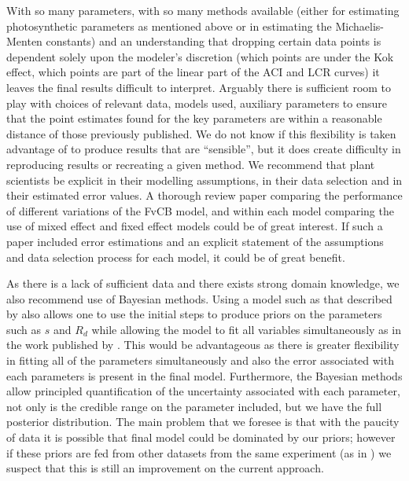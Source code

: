 \documentclass[11pt]{article} %
\begin{document}
With so many parameters, with so many methods available (either for estimating photosynthetic parameters as mentioned above or in estimating the Michaelis-Menten constants) and an understanding that dropping certain data points is dependent solely upon the modeler's discretion (which points are under the Kok effect, which points are part of the linear part of the ACI and LCR curves) it leaves the final results difficult to interpret. Arguably there is sufficient room to play with choices of relevant data, models used, auxiliary parameters to ensure that the point estimates found for the key parameters are within a reasonable distance of those previously published. We do not know if this flexibility is taken advantage of to produce results that are ``sensible'', but it does create difficulty in reproducing results or recreating a given method. We recommend that plant scientists be explicit in their modelling assumptions, in their data selection and in their estimated error values. A thorough review paper comparing the performance of different variations of the FvCB model, and within each model comparing the use of mixed effect and fixed effect models could be of great interest. If such a paper included error estimations and an explicit statement of the assumptions and data selection process for each model, it could be of great benefit.

As there is a lack of sufficient data and there exists strong domain knowledge, we also recommend use of Bayesian methods. Using a model such as that described by \citet{YinUsingcombinedmeasurements2009} also allows one to use the initial steps to produce priors on the parameters such as $s$ and $R_d$ while allowing the model to fit all variables simultaneously as in the work published by \citet{QianEstimationphotosynthesisparameters2012}. This would be advantageous as there is greater flexibility in fitting all of the parameters simultaneously and also the error associated with each parameters is present in the final model. Furthermore, the Bayesian methods allow principled quantification of the uncertainty associated with each parameter, not only is the credible range on the parameter included, but we have the full posterior distribution. The main problem that we foresee is that with the paucity of data it is possible that final model could be dominated by our priors; however if these priors are fed from other datasets from the same experiment (as in \cite{YinUsingcombinedmeasurements2009}) we suspect that this is still an improvement on the current approach.
\end{document}
